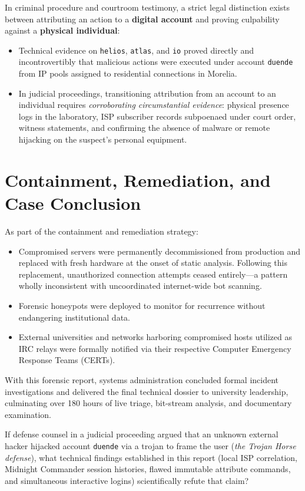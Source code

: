 \begin{notaforense}
In criminal procedure and courtroom testimony, a strict legal distinction exists between attributing an action to a \textbf{digital account} and proving culpability against a \textbf{physical individual}:
\begin{itemize}
    \item Technical evidence on \texttt{helios}, \texttt{atlas}, and \texttt{io} proved directly and incontrovertibly that malicious actions were executed under account \texttt{duende} from IP pools assigned to residential connections in Morelia.
    \item In judicial proceedings, transitioning attribution from an account to an individual requires \textit{corroborating circumstantial evidence}: physical presence logs in the laboratory, ISP subscriber records subpoenaed under court order, witness statements, and confirming the absence of malware or remote hijacking on the suspect's personal equipment.
\end{itemize}
\end{notaforense}

\section{Containment, Remediation, and Case Conclusion}

As part of the containment and remediation strategy:
\begin{itemize}
    \item Compromised servers were permanently decommissioned from production and replaced with fresh hardware at the onset of static analysis. Following this replacement, unauthorized connection attempts ceased entirely---a pattern wholly inconsistent with uncoordinated internet-wide bot scanning.
    \item Forensic honeypots were deployed to monitor for recurrence without endangering institutional data.
    \item External universities and networks harboring compromised hosts utilized as IRC relays were formally notified via their respective Computer Emergency Response Teams (CERTs).
\end{itemize}

With this forensic report, systems administration concluded formal incident investigations and delivered the final technical dossier to university leadership, culminating over 180 hours of live triage, bit-stream analysis, and documentary examination.

\begin{retoforense}
If defense counsel in a judicial proceeding argued that an unknown external hacker hijacked account \texttt{duende} via a trojan to frame the user (\textit{the Trojan Horse defense}), what technical findings established in this report (local ISP correlation, Midnight Commander session histories, flawed immutable attribute commands, and simultaneous interactive logins) scientifically refute that claim?
\end{retoforense}
